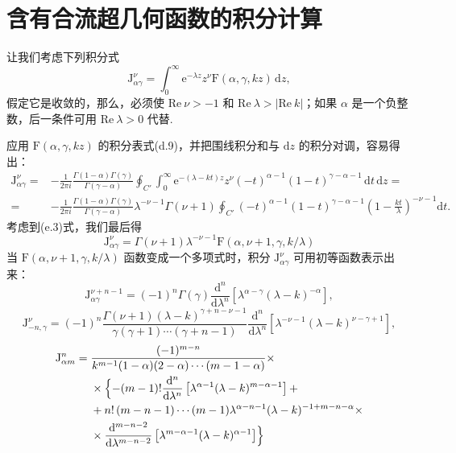 \section{含有合流超几何函数的积分计算}

让我们考虑下列积分式
\begin{equation}
  \mathrm{J}_{\alpha\gamma}^{\nu}=\int_0^{\infty}\mathrm{e}^{-\lambda z}z^{\nu}
  \mathrm{F}(\alpha,\gamma,kz)\,\mathrm{d}z,
\end{equation}
假定它是收敛的，那么，必须使 $\mathrm{Re}\ \nu>-1$ 和 $\mathrm{Re}\ \lambda>|\mathrm{Re}\ k|$；如果 $\alpha$ 是一个负整数，后一条件可用 $\mathrm{Re}\ \lambda>0$ 代替.

应用 $\mathrm{F}(\alpha,\gamma,kz)$ 的积分表式(d.9)，并把围线积分和与 $\mathrm{d}z$ 的积分对调，容易得出：
\begin{equation*}
\begin{aligned}
  \mathrm{J}_{\alpha\gamma}^{\nu}={}&-\frac{1}{2\pi i}
  \frac{\Gamma(1-\alpha)\Gamma(\gamma)}{\Gamma(\gamma-\alpha)}
  \oint_{C'}\int_0^{\infty}\mathrm{e}^{-(\lambda-kt)z}z^{\nu}
  (-t)^{\alpha-1}(1-t)^{\gamma-\alpha-1}\,\mathrm{d}t\,\mathrm{d}z=\\
  ={}&-\frac{1}{2\pi i}\frac{\Gamma(1-\alpha)\Gamma(\gamma)}{\Gamma(\gamma-\alpha)}
  \lambda^{-\nu-1}\Gamma(\nu+1)\oint_{C'}(-t)^{\alpha-1}(1-t)^{\gamma-\alpha-1}
  \left(1-\frac{kt}{\lambda}\right)^{-\nu-1}\mathrm{d}t.
\end{aligned}
\end{equation*}
考虑到(e.3)式，我们最后得
\begin{equation}
  \mathrm{J}_{\alpha\gamma}^{\nu}=\Gamma(\nu+1)\lambda^{-\nu-1}
  \mathrm{F}(\alpha,\nu+1,\gamma,k/\lambda)
\end{equation}
当 $\mathrm{F}(\alpha,\nu+1,\gamma,k/\lambda)$ 函数变成一个多项式时，积分 $\mathrm{J}_{\alpha\gamma}^{\nu}$ 可用初等函数表示出来：
\begin{equation}
  \mathrm{J}_{\alpha\gamma}^{\nu+n-1}=(-1)^n\Gamma(\gamma)
  \frac{\mathrm{d}^n}{\mathrm{d}\lambda^n}
  \left[\lambda^{\alpha-\gamma}(\lambda-k)^{-\alpha}\right],
\end{equation}
\begin{equation}
  \mathrm{J}_{-n,\gamma}^{\nu}=(-1)^n
  \frac{\Gamma(\nu+1)(\lambda-k)^{\gamma+n-\nu-1}}
  {\gamma(\gamma+1)\cdots(\gamma+n-1)}
  \frac{\mathrm{d}^n}{\mathrm{d}\lambda^n}
  \left[\lambda^{-\nu-1}(\lambda-k)^{\nu-\gamma+1}\right],
\end{equation}
\begin{equation}
\begin{aligned}
  \mathrm{J}_{\alpha m}^{n}={}&\frac{(-1)^{m-n}}
  {k^{m-1}(1-\alpha)(2-\alpha)\cdots(m-1-\alpha)}\times\\
  &\times\Bigl\{-(m-1)!\frac{\mathrm{d}^{n}}{\mathrm{d}\lambda^{n}}
  \left[\lambda^{\alpha-1}(\lambda-k)^{m-\alpha-1}\right]+\\
  &+n!\,(m-n-1)\cdots(m-1)\lambda^{\alpha-n-1}(\lambda-k)^{-1+m-n-\alpha}\times\\
  &\times\frac{\mathrm{d}^{m-n-2}}{\mathrm{d}\lambda^{m-n-2}}
  \left[\lambda^{m-\alpha-1}(\lambda-k)^{\alpha-1}\right]\Bigr\}
\end{aligned}
\end{equation}
